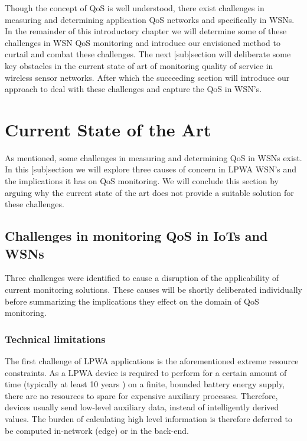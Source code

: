 Though the concept of QoS is well understood, there exist challenges in measuring and determining application QoS networks and specifically in WSNs. In the remainder of this introductory chapter we will determine some of these challenges in WSN QoS monitoring and introduce our envisioned method to curtail and combat these challenges. The next [sub]section will deliberate some key obstacles in the current state of art of monitoring  quality of service in wireless sensor networks. After which the succeeding section will introduce our approach to deal with these challenges and capture the QoS in WSN's.

\section{Current State of the Art}
As mentioned, some challenges in measuring and determining QoS in WSNs exist. In this [sub]section we will explore three causes of concern in LPWA WSN's and the implications it has on QoS monitoring. We will conclude this section by arguing why the current state of the art does not provide a suitable solution for these challenges.
\subsection{Challenges in monitoring QoS in IoTs and WSNs}
\label{sec:challenges}
Three challenges were identified to cause a disruption of the applicability of current monitoring solutions. These causes will be shortly deliberated individually before summarizing the implications they effect on the domain of QoS monitoring.

\subsubsection{Technical limitations}
The first challenge of LPWA applications is the aforementioned extreme resource constraints. As a LPWA device is required to perform for a certain amount of time (typically at least 10 years \cite{???}) on a finite, bounded battery energy supply, there are no resources to spare for expensive auxiliary processes. Therefore, devices usually send low-level auxiliary data, instead of intelligently derived values. The burden of calculating high level information is therefore deferred to be computed in-network (edge) or in the back-end.

